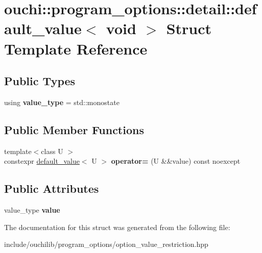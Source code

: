 \hypertarget{structouchi_1_1program__options_1_1detail_1_1default__value_3_01void_01_4}{}\section{ouchi\+::program\+\_\+options\+::detail\+::default\+\_\+value$<$ void $>$ Struct Template Reference}
\label{structouchi_1_1program__options_1_1detail_1_1default__value_3_01void_01_4}
\subsection*{Public Types}
\begin{DoxyCompactItemize}
\item 
\mbox{\label{structouchi_1_1program__options_1_1detail_1_1default__value_3_01void_01_4_a846469fc7d8be20421b666a707824f15}} 
using {\bfseries value\+\_\+type} = std\+::monostate
\end{DoxyCompactItemize}
\subsection*{Public Member Functions}
\begin{DoxyCompactItemize}
\item 
\mbox{\label{structouchi_1_1program__options_1_1detail_1_1default__value_3_01void_01_4_ac3872eb24399e719f66383cde32fa02c}} 
{\footnotesize template$<$class U $>$ }\\constexpr \mbox{\hyperlink{structouchi_1_1program__options_1_1detail_1_1default__value}{default\+\_\+value}}$<$ U $>$ {\bfseries operator=} (U \&\&value) const noexcept
\end{DoxyCompactItemize}
\subsection*{Public Attributes}
\begin{DoxyCompactItemize}
\item 
\mbox{\label{structouchi_1_1program__options_1_1detail_1_1default__value_3_01void_01_4_a31d9c96807433d00ce9a934dc451085b}} 
value\+\_\+type {\bfseries value}
\end{DoxyCompactItemize}


The documentation for this struct was generated from the following file\+:\begin{DoxyCompactItemize}
\item 
include/ouchilib/program\+\_\+options/option\+\_\+value\+\_\+restriction.\+hpp\end{DoxyCompactItemize}
